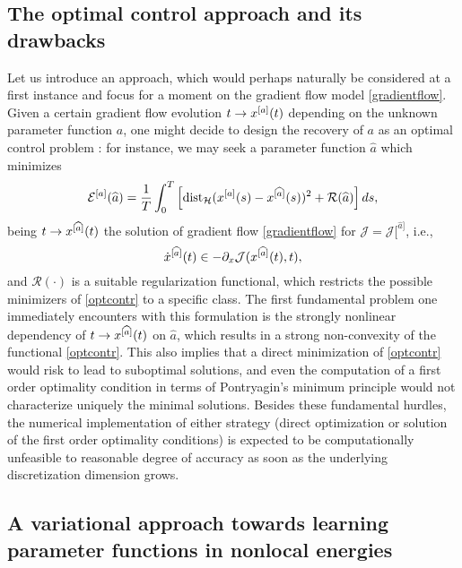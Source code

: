 \subsection{The optimal control approach and its drawbacks}
Let us introduce an approach, which would perhaps naturally be considered at a first instance and focus for a moment on the gradient flow model \eqref{gradientflow}. Given a certain gradient flow evolution $t \to x^{[a]}(t)$ depending on the unknown parameter function $a$, one might decide to design the recovery of $a$ as an optimal control problem \cite{brpi07}: for instance, we may seek a parameter function $\widehat a$ which minimizes
\begin{equation}\label{optcontr}
\mathcal E^{[a]}(\widehat a) = \frac{1}{T}\int_0^T \left [ \operatorname{dist}_{\mathcal H}(x^{[a]}(s) - x^{[\widehat a]}(s))^2 + \mathcal R(\widehat a) \right ] d s ,
\end{equation}
being $t \to x^{[\widehat a]}(t)$ the solution of gradient flow \eqref{gradientflow} for $\mathcal J = \mathcal J[^{\widehat a]}$, i.e.,
\begin{equation}\label{gradientflow2}
\dot{x}^{[\widehat a]}(t) \in - \partial_x \mathcal J(x^{[\widehat a]}(t),t),
\end{equation}
and $\mathcal R(\cdot)$ is a suitable regularization functional, which restricts the possible minimizers of \eqref{optcontr} to a specific class. The first fundamental problem one immediately encounters with this formulation is the strongly nonlinear dependency of $t \to x^{[\widehat a]}(t)$ on $\widehat a$, which results in a strong non-convexity of the functional \eqref{optcontr}. This also implies that a direct minimization of \eqref{optcontr} would risk to lead to suboptimal solutions, and even the computation of a first order optimality condition in terms of Pontryagin's minimum principle would not characterize uniquely the minimal solutions. Besides these fundamental hurdles, the numerical implementation of either strategy (direct optimization or solution of the first order optimality conditions) is expected to be computationally unfeasible to reasonable degree of accuracy as soon as the underlying discretization dimension grows.

\subsection{A variational approach towards learning parameter functions in nonlocal energies}\label{sec:wp2}

